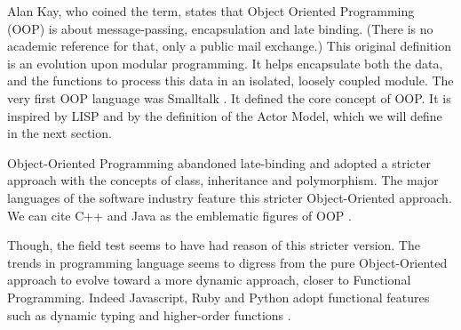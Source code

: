 Alan Kay, who coined the term, states that Object Oriented Programming (OOP) is about message-passing, encapsulation and late binding.
(There is no academic reference for that, only a public mail exchange.)
This original definition is an evolution upon modular programming.
It helps encapsulate both the data, and the functions to process this data in an isolated, loosely coupled module.
The very first OOP language was Smalltalk \cite{Goldberg1984}.
It defined the core concept of OOP.
It is inspired by LISP and by the definition of the Actor Model, which we will define in the next section.


Object-Oriented Programming abandoned late-binding and adopted a stricter approach with the concepts of class, inheritance and polymorphism.
The major languages of the software industry feature this stricter Object-Oriented approach.
We can cite C++ and Java as the emblematic figures of OOP \cite{Gosling2000,Stroustrup1986}.

Though, the field test seems to have had reason of this stricter version.
The trends in programming language seems to digress from the pure Object-Oriented approach to evolve toward a more dynamic approach, closer to Functional Programming.
Indeed Javascript, Ruby and Python adopt functional features such as dynamic typing and higher-order functions \cite{Ecma1999}.



